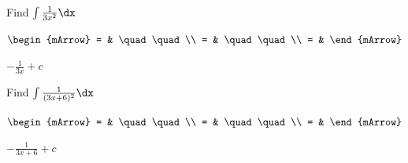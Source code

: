 \begin{mtask}[resume]
   \task \begin{exercise} Find $\int \frac{1}{3x^2} \dx$
           \begin{envSolution}
             $\begin{mArrow}
                 = & \quad \quad              \\
		   		 = & \quad \quad              \\
				 = &  
              \end{mArrow}$
            \begin{shortsolution}  
			     $-\frac{1}{3x} + c $
			\end{shortsolution}				 
           \end{envSolution}
         \end{exercise}
		 
   \task \begin{exercise} Find $\int \frac{1}{(3x+6)^2} \dx$
           \begin{envSolution}
             $\begin{mArrow}
                 = & \quad \quad              \\
		   		 = & \quad \quad              \\
				 = &  
              \end{mArrow}$
            \begin{shortsolution}  
			     $-\frac{1}{3x+6} + c $
			\end{shortsolution}				 
           \end{envSolution}
         \end{exercise}

		 
\end{mtask}

